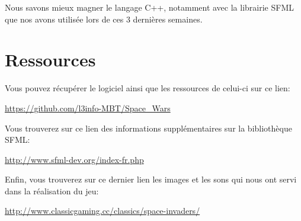 \documentclass[french, 11pt]{report}
\begin{document}
				Nous savons mieux magner le langage C++, notamment avec la librairie SFML que nos avons utilisée lors de ces 3 dernières semaines.

		\section{Ressources}
			 Vous pouvez récupérer le logiciel ainsi que les ressources de celui-ci sur ce lien:
			 \begin{description}
			 	\item \href{https://github.com/l3info-MBT/Space_Wars}{https://github.com/l3info-MBT/Space\_Wars}
			 \end{description}
			 
			 Vous trouverez sur ce lien des informations supplémentaires sur la bibliothèque SFML:
			 \begin{description}
			 	\item
			 	\href{http://www.sfml-dev.org/index-fr.php}{http://www.sfml-dev.org/index-fr.php}
			 \end{description}
			 
			 Enfin, vous trouverez sur ce dernier lien les images et les sons qui nous ont servi dans la réalisation du jeu:
			 \begin{description}
			 	\item
			 	\href{http://www.classicgaming.cc/classics/space-invaders/}{http://www.classicgaming.cc/classics/space-invaders/}
			 \end{description}
			 
\end{document}
